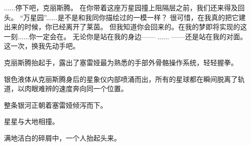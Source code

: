 \documentclass[openany]{book}
\begin{document}
\begin{dialogue}
     ......停下吧，克丽斯腾。
     在你带着这座万星园撞上阻隔层之前，我们还来得及回头。
     “万星园”......是不是和我同你描绘过的一模一样？
     很可惜，在我真的把它建出来的时候，你已经离开了莱茵。
     但我知道你会回来的。在我的梦即将实现的这一刻......你一定会在。
     无论你是站在我的身边——
     ......
     ——还是站在我的对面。
     这一次，换我先动手吧。\par
    克丽斯腾抬起手，露出了塞雷娅最为熟悉的手部外骨骼操作系统，轻轻握拳。\par
    银色液体从克丽斯腾身后的星象仪内部喷涌而出，所有的星球都在瞬间脱离了轨道，以肉眼难辨的速度奔向同一个位置。\par
    整条银河正朝着塞雷娅倾泻而下。
\end{dialogue}\par

星星与大地相撞。\par
满地洁白的碎屑中，一个人抬起头来。
\end{document}
